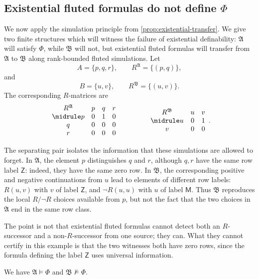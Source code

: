 \documentclass{lmcs}
\newcommand{\A}{\mathfrak{A}}
\newcommand{\B}{\mathfrak{B}}
\newcommand{\Zt}{\mathsf{Z}}
\newcommand{\Mt}{\mathsf{M}}
\begin{document}
\subsection{Existential fluted formulas do not define \texorpdfstring{\(\Phi\)}{Phi}}
\label{sec:los-tarski-separation}

We now apply the simulation principle from
\cref{prop:existential-transfer}.  We give two finite structures which will
witness the failure of existential definability: \(\A\) will satisfy
\(\Phi\), while \(\B\) will not, but existential fluted formulas will
transfer from \(\A\) to \(\B\) along rank-bounded fluted simulations.  Let
\[
  A=\{p,q,r\},
  \qquad
  R^{\A}=\{(p,q)\},
\]
and
\[
  B=\{u,v\},
  \qquad
  R^{\B}=\{(u,v)\}.
\]
The corresponding \(R\)-matrices are
\[
\begin{array}{cccc}
 R^{\A} & p&q&r\\ \midrule
 p&0&1&0\\
 q&0&0&0\\
 r&0&0&0
\end{array}
\qquad\qquad
\begin{array}{ccc}
 R^{\B} & u&v\\ \midrule
 u&0&1\\
 v&0&0
\end{array}.
\]

The separating pair isolates the information that these simulations are
allowed to forget.  In \(\A\), the element \(p\) distinguishes \(q\) and
\(r\), although \(q,r\) have the same row label \(\Zt\): indeed, they have
the same zero row.  In \(\B\), the corresponding positive and negative
continuations from \(u\) lead to elements of different row labels:
\(R(u,v)\) with \(v\) of label \(\Zt\), and \(\neg R(u,u)\) with \(u\) of
label \(\Mt\).  Thus \(\B\) reproduces the local \(R/\neg R\) choices
available from \(p\), but not the fact that the two choices in \(\A\) end in
the same row class.

The point is not that existential fluted formulas cannot detect both an
\(R\)-successor and a non-\(R\)-successor from one source; they can.  What
they cannot certify in this example is that the two witnesses both have zero
rows, since the formula defining the label \(\Zt\) uses universal
information.

\begin{lem}
\label{lem:Phi-values}
We have \(\A\models\Phi\) and \(\B\not\models\Phi\).
\end{lem}
\end{document}
